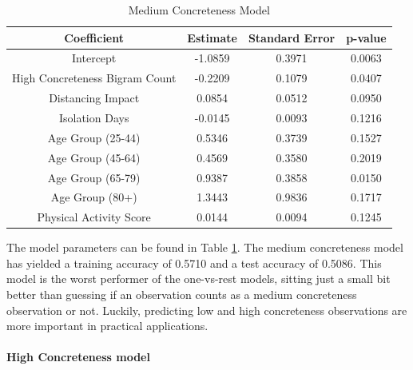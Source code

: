 \documentclass[12pt, a4paper]{article}
\begin{document}
\begin{table}[ht]
\centering
\begin{tabular}{||c c c c||} 
 \hline
 Coefficient & Estimate & Standard Error & p-value \\ [0.5ex] 
 \hline\hline
 Intercept & -1.0859 & 0.3971 & 0.0063 \\ 
 High Concreteness Bigram Count & -0.2209 & 0.1079 & 0.0407 \\
 Distancing Impact  & 0.0854 & 0.0512 & 0.0950 \\ 
 Isolation Days & -0.0145 & 0.0093 & 0.1216 \\ 
 Age Group (25-44)  & 0.5346 & 0.3739 & 0.1527 \\ 
 Age Group (45-64)  & 0.4569 & 0.3580 & 0.2019 \\
 Age Group (65-79)  & 0.9387 & 0.3858 & 0.0150 \\
 Age Group (80+)  & 1.3443 & 0.9836 & 0.1717 \\
 Physical Activity Score  & 0.0144 & 0.0094 & 0.1245 \\ [1ex] 
 \hline
\end{tabular}
\caption{Medium Concreteness Model}
\label{table:medium}
\end{table}

The model parameters can be found in Table \ref{table:medium}. The medium concreteness model has yielded a training accuracy of 0.5710 and a test accuracy of 0.5086. This model is the worst performer of the one-vs-rest models, sitting just a small bit better than guessing if an observation counts as a medium concreteness observation or not. Luckily, predicting low and high concreteness observations are more important in practical applications. 

\paragraph{High Concreteness model}
\end{document}
